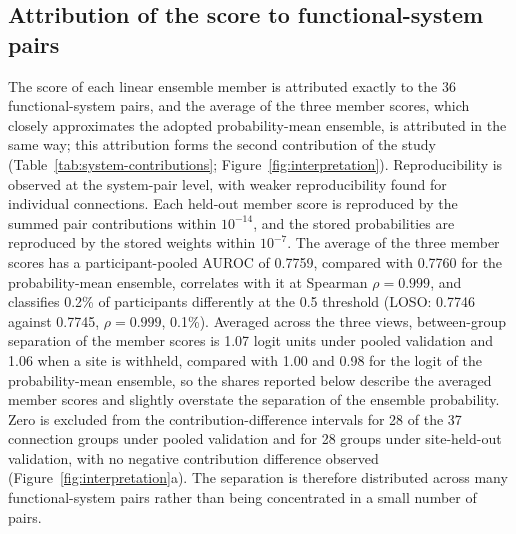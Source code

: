 \subsection{Attribution of the score to functional-system pairs}
\label{subsec:results-interpretation}

The score of each linear ensemble member is attributed exactly to the 36 functional-system pairs, and the average of the three member scores, which closely approximates the adopted probability-mean ensemble, is attributed in the same way; this attribution forms the second contribution of the study (Table~\ref{tab:system-contributions}; Figure~\ref{fig:interpretation}). Reproducibility is observed at the system-pair level, with weaker reproducibility found for individual connections. Each held-out member score is reproduced by the summed pair contributions within $10^{-14}$, and the stored probabilities are reproduced by the stored weights within $10^{-7}$. The average of the three member scores has a participant-pooled AUROC of 0.7759, compared with 0.7760 for the probability-mean ensemble, correlates with it at Spearman $\rho=0.999$, and classifies 0.2\% of participants differently at the 0.5 threshold (LOSO: 0.7746 against 0.7745, $\rho=0.999$, 0.1\%). Averaged across the three views, between-group separation of the member scores is 1.07 logit units under pooled validation and 1.06 when a site is withheld, compared with 1.00 and 0.98 for the logit of the probability-mean ensemble, so the shares reported below describe the averaged member scores and slightly overstate the separation of the ensemble probability. Zero is excluded from the contribution-difference intervals for 28 of the 37 connection groups under pooled validation and for 28 groups under site-held-out validation, with no negative contribution difference observed (Figure~\ref{fig:interpretation}a). The separation is therefore distributed across many functional-system pairs rather than being concentrated in a small number of pairs.

